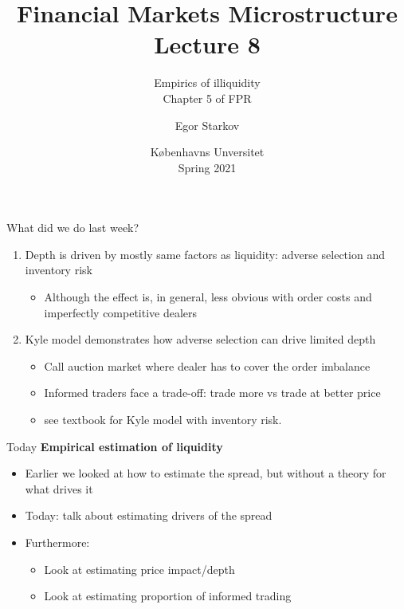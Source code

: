 \documentclass[english,10pt
,aspectratio=169
]{beamer}
\title{Financial Markets Microstructure \\ Lecture 8}
\subtitle{Empirics of illiquidity\\
	Chapter 5 of FPR}
\author{Egor Starkov}
\date{K{\o}benhavns Unversitet \\
	Spring 2021}
\begin{document}
	

\frame[plain]{\titlepage}


\begin{frame}{What did we do last week?}
	\begin{enumerate}
		\item Depth is driven by mostly same factors as liquidity: adverse selection and inventory risk
		\begin{itemize}
			\item Although the effect is, in general, less obvious with order costs and imperfectly competitive dealers
		\end{itemize}
		\item Kyle model demonstrates how adverse selection can drive limited depth
		\begin{itemize}
			\item Call auction market where dealer has to cover the order imbalance
			\item Informed traders face a trade-off: trade more vs trade at better price
			\item see textbook for Kyle model with inventory risk.
		\end{itemize}
	\end{enumerate}
\end{frame}


\begin{frame}{Today}
	\textbf{Empirical estimation of liquidity}
	\begin{itemize}
		\item Earlier we looked at how to estimate the spread, but without a theory for what drives it
		\item Today: talk about estimating drivers of the spread
		\item Furthermore:
		\begin{itemize}
			\item Look at estimating price impact/depth
			\item Look at estimating proportion of informed trading
		\end{itemize}
	\end{itemize}
\end{frame}
\end{document}
